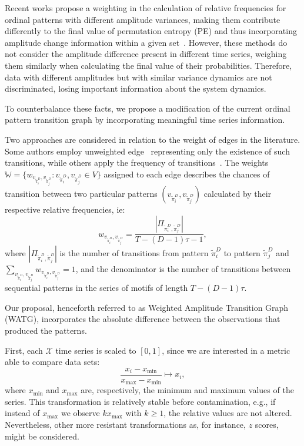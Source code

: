 \documentclass{isprs}
\begin{document}
Recent works propose a weighting in the calculation of relative frequencies for ordinal patterns with different amplitude variances, making them contribute differently to the final value of permutation entropy (PE) and thus incorporating amplitude change information within a given set~\cite{Fadlallah2013Weightedpermutation}.
However, these methods do not consider the amplitude difference present in different time series, weighing them similarly when calculating the final value of their probabilities.
Therefore, data with different amplitudes but with similar variance dynamics are not discriminated, losing important information about the system dynamics.

To counterbalance these facts, we propose a modification of the current ordinal pattern transition graph by incorporating meaningful time series information.

Two approaches are considered in relation to the weight of edges in the literature.
Some authors employ unweighted edge~\cite{McCullough2015lagged,Kulp2016ordinal} representing only the existence of such transitions, while others apply the frequency of transitions~\cite{Sorrentino2015periodic,Zhang2017ConstructingOP}.
The weights $\mathbb{W} = \{w_{v_{\widetilde{\pi}^D_i}, v_{\widetilde\pi^D_j}}: v_{\widetilde\pi^D_i}, v_{\widetilde\pi^D_j} \in V \}$ assigned to each edge describes the chances of transition between two particular patterns $(v_{\widetilde\pi^D_i}, v_{\widetilde\pi^D_j})$ calculated by their respective relative frequencies, ie:
\begin{equation}
w_{v_{\widetilde\pi^D_i}, v_{\widetilde\pi^D_j}} = \frac{|\Pi_{\widetilde\pi^D_i,\widetilde\pi^D_j}|}{T-(D-1)\tau-1},
\end{equation}
where $|\Pi_{\widetilde\pi^D_i,\widetilde\pi^D_j}|$ is the number of transitions from pattern $\widetilde\pi^D_i$ to pattern $\widetilde\pi^D_j$ and $\sum_{v_{\widetilde\pi^D_i}, v_{\widetilde\pi^D_j}}w_{v_{\widetilde\pi^D_i}, v_{\widetilde\pi^D_j}} = 1$,
and the denominator is the number of transitions between sequential patterns in the series of motifs of length $T-(D-1)\tau$.

Our proposal, henceforth referred to as Weighted Amplitude Transition Graph (WATG), incorporates the absolute difference between the observations that produced the patterns.

First, each $\mathcal{X}$ time series is scaled to $[0, 1]$, since we are interested in a metric able to compare data sets:
\begin{equation}
 \frac{x_i - x_{\min}}{x_{\max} - x_{\min}} \longmapsto x_i,
\end{equation}
where $x_{\min}$ and $x_{\max}$ are, respectively, the minimum and maximum values of the series.
This transformation is relatively stable before contamination, e.g., if instead of $x_{\max}$ we observe $k x_{\max}$ with $k\geq 1$, the relative values are not altered. Nevertheless, other more resistant transformations as, for instance, $z$ scores, might be considered.
\end{document}
